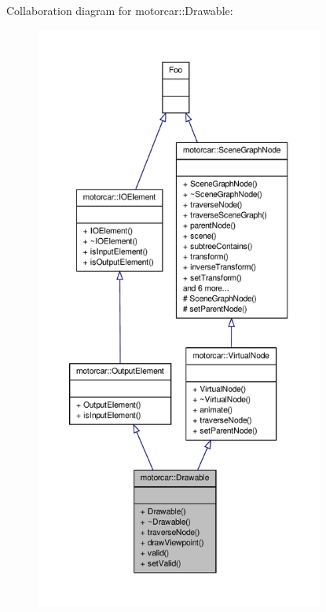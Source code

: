 Collaboration diagram for motorcar\-:\-:Drawable\-:
\nopagebreak
\begin{figure}[H]
\begin{center}
\leavevmode
\includegraphics[height=550pt]{classmotorcar_1_1Drawable__coll__graph}
\end{center}
\end{figure}
